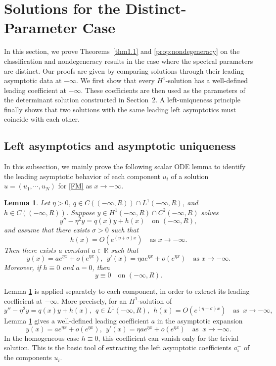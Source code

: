 \documentclass[11pt]{article}
\numberwithin{equation}{section}
\newtheorem{lemma}[theorem]{Lemma}
\theoremstyle{definition}
\begin{document}
\section{Solutions for the Distinct-Parameter Case}
In this section, we prove   Theorems~\ref{thm1.1} and \ref{prop:nondegeneracy} on  the classification and nondegeneracy results
in the case where the spectral parameters are distinct.  Our proofs are given  by  comparing solutions through their leading asymptotic
data at \( -\infty \).  We first show that every
\(H^1\)-solution has a well-defined leading coefficient at \(-\infty\).
These coefficients are then   used as the parameters of the determinant
solution constructed in Section~2.  A left-uniqueness principle finally
shows that two solutions with the same leading left asymptotics must
coincide with each other.

\subsection{Left asymptotics and asymptotic uniqueness}
In this subsection, we mainly prove the following scalar ODE lemma to identify the leading asymptotic
behavior of each component \(u_i\) of a solution
\(u=(u_1,\cdots,u_N)\) for \eqref{FM} as \(x\to-\infty\).


\begin{lemma}
\label{lem:L1-asymptotic}
Let \(\eta>0\),
\(q\in C((-\infty,R))\cap L^1(-\infty,R)\), and
\(h\in C((-\infty,R))\). Suppose
\(
y\in H^1(-\infty,R)\cap C^2(-\infty,R)
\) solves
\begin{equation}\label{eq:L1-linear-ode}
	y''-\eta^2y=q(x)y+h(x)
	\quad\text{on }(-\infty,R),
\end{equation}
and assume that there exists \(\sigma>0\) such that
\[
h(x)=O(e^{(\eta+\sigma)x})\quad \text{as }x\to-\infty.
\]
Then there exists a constant \(a\in\mathbb R\) such that
\[
y(x)=a e^{\eta x}+o(e^{\eta x}),
\ \
y'(x)=\eta a e^{\eta x}+o(e^{\eta x})\quad \text{as }x\to-\infty.
\]
Moreover, if \(h\equiv0\) and \(a=0\), then
\[
y\equiv0
\quad\text{on }(-\infty,R).
\]
\end{lemma}



Lemma \ref{lem:L1-asymptotic} is applied separately to each component, in order to extract
its leading coefficient at \(-\infty\). More precisely, for an
\(H^1\)-solution of
\[
y''-\eta^2y=q(x)y+h(x),
\ \
q\in L^1(-\infty,R),
\ \
h(x)=O(e^{(\eta+\sigma)x})\quad \text{as }\ x\to-\infty,
\]
Lemma \ref{lem:L1-asymptotic} gives a well-defined leading coefficient \(a\) in the
asymptotic expansion
\[
y(x)=a e^{\eta x}+o(e^{\eta x}),
\ \
y'(x)=\eta a e^{\eta x}+o(e^{\eta x})
\quad \text{as }\ x\to-\infty.
\]
In the homogeneous case \(h\equiv0\), this coefficient can vanish only
for the trivial solution. This is the basic tool of extracting the
left asymptotic coefficients \(a_i^-\) of the components \(u_i\).
\end{document}
